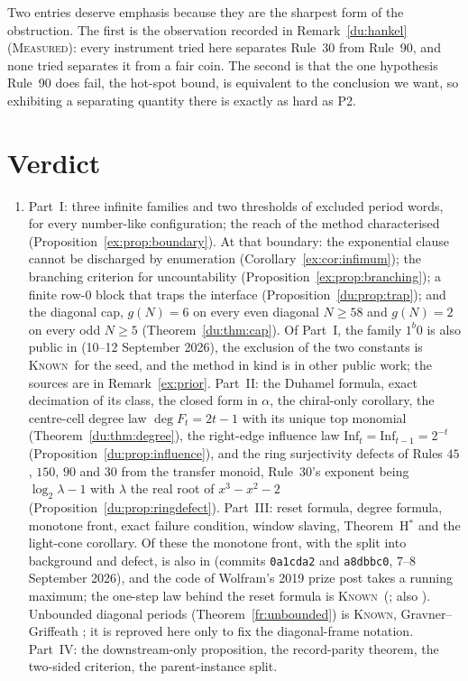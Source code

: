 \documentclass[11pt]{article}
\theoremstyle{definition}
\theoremstyle{remark}
\newcommand{\PROVED}{\textsc{Proved}}
\newcommand{\MEASURED}{\textsc{Measured}}
\newcommand{\KNOWN}{\textsc{Known}}
\begin{document}
Two entries deserve emphasis because they are the sharpest form of the obstruction. The first is the
observation recorded in Remark~\ref{du:hankel} (\MEASURED): every instrument tried here separates Rule~30 from
Rule~90, and none tried separates it from a fair coin. The second is that the one
hypothesis Rule~90 does fail, the hot-spot bound, is equivalent to the conclusion we want, so
exhibiting a separating quantity there is exactly as hard as P2.

\section{Verdict}\label{sec:verdict}

\begin{enumerate}[nosep]
\item[\PROVED] Part~I: three infinite families and two thresholds of excluded period words, for every number-like configuration; the reach of the method characterised (Proposition~\ref{ex:prop:boundary}). At that boundary: the exponential clause cannot be discharged by enumeration (Corollary~\ref{ex:cor:infimum}); the branching criterion for uncountability (Proposition~\ref{ex:prop:branching}); a finite row-$0$ block that traps the interface (Proposition~\ref{du:prop:trap}); and the diagonal cap, $g(N)=6$ on every even diagonal $N\ge58$ and $g(N)=2$ on every odd $N\ge5$ (Theorem~\ref{du:thm:cap}). Of Part~I, the family $1^b0$ is also public in \cite{Cochon} (10--12 September 2026), the exclusion of the two constants is \KNOWN\ for the seed, and the method in kind is in other public work; the sources are in Remark~\ref{ex:prior}. Part~II: the Duhamel formula, exact decimation of its class, the closed form in $\alpha$, the chiral-only corollary, the centre-cell degree law $\deg F_t=2t-1$ with its unique top monomial (Theorem~\ref{du:thm:degree}), the right-edge influence law $\mathrm{Inf}_{t}=\mathrm{Inf}_{t-1}=2^{-t}$ (Proposition~\ref{du:prop:influence}), and the ring surjectivity defects of Rules $45$, $150$, $90$ and $30$ from the transfer monoid, Rule~$30$'s exponent being $\log_2\lambda-1$ with $\lambda$ the real root of $x^{3}-x^{2}-2$ (Proposition~\ref{du:prop:ringdefect}). Part~III: reset formula, degree formula, monotone front, exact failure condition, window slaving, Theorem~H$^*$ and the light-cone corollary. Of these the monotone front, with the split into background and defect, is also in \cite{Dib} (commits \texttt{0a1cda2} and \texttt{a8dbbc0}, 7--8 September 2026), and the code of Wolfram's 2019 prize post \cite{Wolfram19} takes a running maximum; the one-step law behind the reset formula is \KNOWN\ (\cite[Lemma~3]{Rowland}; also \cite{Pat,Dib,Nersissian}). Unbounded diagonal periods (Theorem~\ref{fr:unbounded}) is \KNOWN, Gravner--Griffeath \cite[Prop.~3.3]{GG}; it is reproved here only to fix the diagonal-frame notation. Part~IV: the downstream-only proposition, the record-parity theorem, the two-sided criterion, the parent-instance split.

\end{enumerate}
\end{document}

